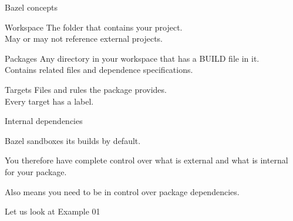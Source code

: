 \documentclass[11pt]{beamer}
\begin{document}
\begin{frame}{Bazel concepts}

  \begin{alertblock}{Workspace} \vspace{1pt}
    The folder that contains your project.\\
    May or may not reference external projects.
  \end{alertblock}

  \vspace{2mm}

  \begin{alertblock}{Packages} \vspace{1pt}
    Any directory in your workspace that has a {\ttfamily BUILD} file in it.\\
    Contains related files and dependence specifications.
  \end{alertblock}

  \vspace{2mm}

  \begin{alertblock}{Targets} \vspace{1pt}
    Files and rules the package provides.\\
    Every target has a label.
  \end{alertblock}

  \BazelNavIcon{}
\end{frame}

\begin{frame}{Internal dependencies}

  \alert{Bazel} sandboxes its builds by default.

  \vspace{5mm}

  You therefore have complete control over what is external and what is internal
  for your package.

  \vspace{5mm}

  Also means you need to be in control over package dependencies.

  \vspace{5mm}

  Let us look at Example 01

  \BazelNavIcon{}
\end{frame}
\end{document}

